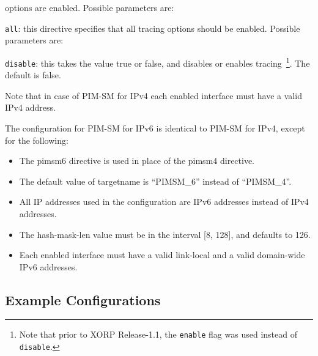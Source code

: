 \begin{description}
\begin{description}
  options are enabled.  Possible parameters are:
\begin{description}
\item{\tt all}: this directive specifies that all tracing
  options should be enabled.  Possible parameters are:
\begin{description}
\item{\tt disable}: this takes the value {\stt true} or {\stt false},
  and disables or enables tracing~\footnote{Note
  that prior to XORP Release-1.1, the {\tt enable} flag was used instead of
  {\tt disable}.}. The default is {\stt false}.
\end{description}
\end{description}
\end{description}
\end{description}

Note that in case of PIM-SM for IPv4 each enabled interface must have a
valid IPv4 address.

The configuration for PIM-SM for IPv6 is identical to PIM-SM for IPv4,
except for the following:
\begin{itemize}
\item The {\stt pimsm6} directive is used in place of the
  {\stt pimsm4} directive.
\item The default value of {\stt targetname} is {\stt ``PIMSM\_6''}
  instead of {\stt ``PIMSM\_4''}.
\item All IP addresses used in the configuration are IPv6 addresses
  instead of IPv4 addresses.
\item The {\stt hash-mask-len} value must be in the interval [8, 128],
  and defaults to 126.
\item Each enabled interface must have a valid link-local and a valid
  domain-wide IPv6 addresses.
\end{itemize}

\newpage
\subsection{Example Configurations}

